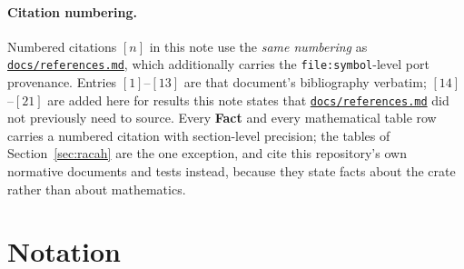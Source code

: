 \documentclass[11pt,a4paper]{article}
\theoremstyle{plain}
\theoremstyle{definition}
\newcommand{\code}[1]{\texttt{#1}}
\newcommand{\refsmd}{\href{https://github.com/Ryo-wtnb11/racah/blob/main/docs/references.md}{\code{docs/references.md}}}
\begin{document}
\paragraph{Citation numbering.} Numbered citations $[n]$ in this note use the
\emph{same numbering} as \refsmd{}, which additionally carries the
\code{file:symbol}-level port provenance. Entries $[1]$--$[13]$ are that
document's bibliography verbatim; $[14]$--$[21]$ are added here for results
this note states that \refsmd{} did not previously need to source. Every
\textbf{Fact} and every mathematical table row carries a numbered citation
with section-level precision; the tables of Section~\ref{sec:racah} are the
one exception, and cite this repository's own normative documents and tests
instead, because they state facts about the crate rather than about
mathematics.

\section{Notation}
\end{document}
